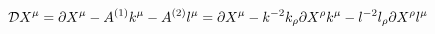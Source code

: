 \begin{equation}
{\cal D}X^\mu=\partial X^\mu-A^{(1)}k^\mu-A^{(2)}l^\mu=\partial X^\mu-k^{-2}
k_\rho \partial X^\rho k^\mu-l^{-2}l_\rho\partial X^\rho l^\mu
\end{equation}

